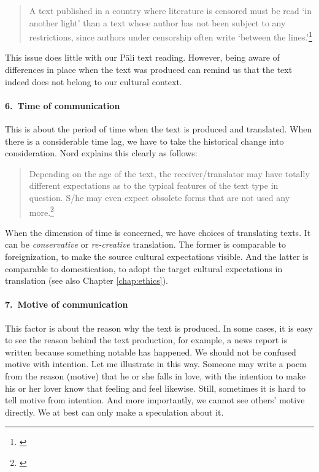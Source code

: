 \begin{quote}
A text published in a country where literature is censored must be read `in another light' than a text whose author has not been subject to any restrictions, since authors under censorship often write `between the lines.'\footnote{\citealp[p.~68]{nord:analysis}}
\end{quote}

This issue does little with our P\=ali text reading. However, being aware of differences in place when the text was produced can remind us that the text indeed does not belong to our cultural context.

\paragraph*{6.\ Time of communication} This is about the period of time when the text is produced and translated. When there is a considerable time lag, we have to take the historical change into consideration. Nord explains this clearly as follows:

\begin{quote}
Depending on the age of the text, the receiver/translator may have totally different expectations as to the typical features of the text type in question. S/he may even expect obsolete forms that are not used any more.\footnote{\citealp[p.~70]{nord:analysis}}
\end{quote}

When the dimension of time is concerned, we have choices of translating texts. It can be \emph{conservative} or \emph{re-creative} translation. The former is comparable to foreignization, to make the source cultural expectations visible. And the latter is comparable to domestication, to adopt the target cultural expectations in translation (see also Chapter \ref{chap:ethics}).

\paragraph*{7.\ Motive of communication} This factor is about the reason why the text is produced. In some cases, it is easy to see the reason behind the text production, for example, a news report is written because something notable has happened. We should not be confused motive with intention. Let me illustrate in this way. Someone may write a poem from the reason (motive) that he or she falls in love, with the intention to make his or her lover know that feeling and feel likewise. Still, sometimes it is hard to tell motive from intention. And more importantly, we cannot see others' motive directly. We at best can only make a speculation about it.

